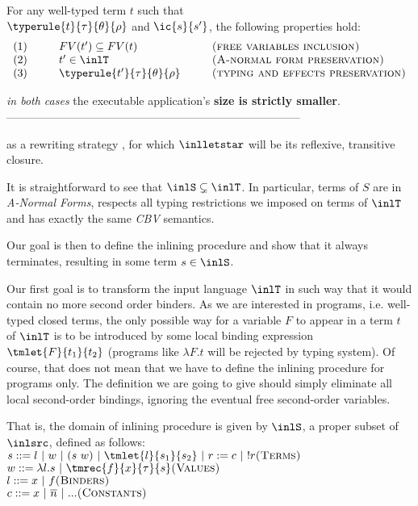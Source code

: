 \begin{lemma}
For any well-typed term $t$ such that\\ $\typerule{t}{\tau}{\theta}{\rho}$ and $\ic{s}{s'}$, the following properties hold:
\begin{displaymath}
\begin{array}{l@{\hspace*{1cm}}l@{\hspace*{1cm}}l}
	(1)& FV(t') \subseteq FV(t) & \textsc{(free variables inclusion)} \\
	(2)& t' \in \inlT & \textsc{(A-normal form preservation)}\\ 
	(3)& \typerule{t'}{\tau}{\theta}{\rho} &\textsc{(typing and effects preservation)}
	\end{array}
\end{displaymath}
 \label{ic-prop-l}
\end{lemma}	

	\textit{in both cases} the executable application's \textbf{size is strictly smaller}.  
------------------------------------------------------------------------------


as a rewriting strategy 
, for which $\inlletstar$ will be its reflexive, transitive closure.

It is straightforward to see that $\inlS \subsetneq \inlT$. In particular,
terms of $S$ are in \textit{A-Normal Forms}, respects all typing restrictions 
we imposed on terms of $\inlT$ and has exactly the same \textit{CBV} semantics. 

Our goal is then to define the inlining procedure and show that it always
terminates, resulting in some term $s \in \inlS$.


Our first goal is to transform the input language $\inlT$ in such way that it
would contain no more second order binders. As we are interested in programs, 
i.e. well-typed closed terms, the only possible way for a variable $F$ to 
appear in a term $t$ of $\inlT$ is to be introduced by some local binding 
expression $\tmlet{F}{t_1}{t_2}$ (programs like $\lambda F. t$ will be
rejected by typing system). Of course, that does not mean that we have to define 
the inlining procedure for programs only. The definition we are going to give
should simply eliminate all local second-order bindings, ignoring the eventual
free second-order variables.


That is, the domain of inlining procedure is given by $\inlS$, a proper subset of $\inlsrc$, defined as follows:\\
  $ s ::= l~|~w~|~(s~w) ~|~ \tmlet{l}{s_1}{s_2} ~|~ r:= c ~|~ !r \hfill \textsc{(Terms)}$ \\\indent 
  $ w ::= \lambda l. s ~|~ \tmrec{f}{x}{\tau}{s}\hfill \textsc{(Values)}$ \\\indent 
  $ l ::= x ~|~ f \hfill \textsc{(Binders)}$ \\\indent 
  $ c ::= x ~|~ \overline{n}~|~... \hfill \textsc{(Constants)}$\\[1em]

